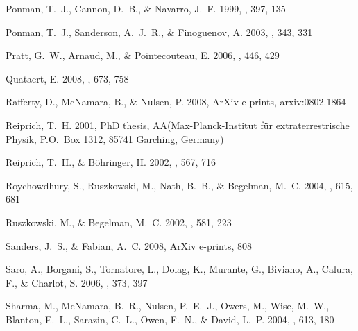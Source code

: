 \documentclass[12pt,preprint]{aastex}
\begin{document}
\begin{thebibliography}{138}
{Ponman}, T.~J., {Cannon}, D.~B., \& {Navarro}, J.~F. 1999, \nat, 397, 135

{Ponman}, T.~J., {Sanderson}, A.~J.~R., \& {Finoguenov}, A. 2003, \mnras, 343,
  331

{Pratt}, G.~W., {Arnaud}, M., \& {Pointecouteau}, E. 2006, \aap, 446, 429

{Quataert}, E. 2008, \apj, 673, 758

{Rafferty}, D., {McNamara}, B., \& {Nulsen}, P. 2008, ArXiv e-prints,
  arxiv:0802.1864

{Reiprich}, T.~H. 2001, PhD thesis, AA(Max-Planck-Institut f{\"u}r
  extraterrestrische Physik, P.O.~Box 1312, 85741 Garching, Germany)

{Reiprich}, T.~H., \& {B{\"o}hringer}, H. 2002, \apj, 567, 716

{Roychowdhury}, S., {Ruszkowski}, M., {Nath}, B.~B., \& {Begelman}, M.~C. 2004,
  \apj, 615, 681

{Ruszkowski}, M., \& {Begelman}, M.~C. 2002, \apj, 581, 223

{Sanders}, J.~S., \& {Fabian}, A.~C. 2008, ArXiv e-prints, 808

{Saro}, A., {Borgani}, S., {Tornatore}, L., {Dolag}, K., {Murante}, G.,
  {Biviano}, A., {Calura}, F., \& {Charlot}, S. 2006, \mnras, 373, 397

{Sharma}, M., {McNamara}, B.~R., {Nulsen}, P.~E.~J., {Owers}, M., {Wise},
  M.~W., {Blanton}, E.~L., {Sarazin}, C.~L., {Owen}, F.~N., \& {David}, L.~P.
  2004, \apj, 613, 180


\end{thebibliography}
\end{document}
